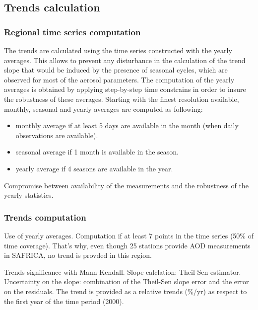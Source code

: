 \documentclass[journal abbreviation, manuscript]{copernicus}
\begin{document}
\subsection{Trends calculation}

\subsubsection{Regional time series computation}
The trends are calculated using the time series constructed with the yearly averages. This allows to prevent any disturbance in the calculation of the trend slope that would be induced by the presence of seasonal cycles, which are observed for most of the aerosol parameters. The computation of the yearly averages is obtained by applying step-by-step time constrains in order to insure the robustness of these averages. Starting with the finest resolution available, monthly, seasonal and yearly averages are computed as following:
\begin{itemize}
 \item monthly average if at least 5 days are available in the month (when daily observations are available).
 \item seasonal average if 1 month is available in the season.
 \item yearly average if 4 seasons are available in the year.
\end{itemize}
Compromise between availability of the measurements and the robustness of the yearly statistics.

\subsubsection{Trends computation}
Use of yearly averages. Computation if at least 7 points in the time series (50\% of time coverage). That's why, even though 25 stations provide AOD measurements in SAFRICA, no trend is provded in this region.

Trends significance with Mann-Kendall.
Slope calclation: Theil-Sen estimator.
Uncertainty on the slope: combination of the Theil-Sen slope error and the error on the residuals.
The trend is provided as a relative trends (\%/yr) as respect to the first year of the time period (2000).
\end{document}
